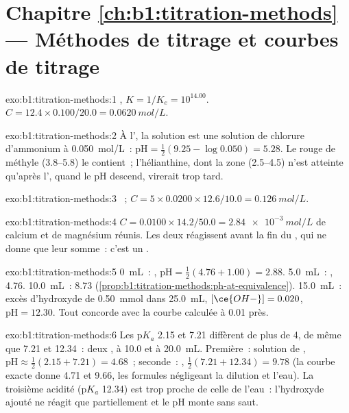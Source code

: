 \section*{Chapitre \ref{ch:b1:titration-methods} --- Méthodes de titrage et courbes de titrage}

\begin{solution}{exo:b1:titration-methods:1}
, $K = 1/K_e = 10^{14.00}$. $C = 12.4 \times
0.100/20.0 = \qty{0.0620}{mol/L}$.
\end{solution}

\begin{solution}{exo:b1:titration-methods:2}
À l', la solution est une solution de chlorure d'ammonium à
\qty{0.050}{mol/L}~: $\mathrm{pH} = \frac12(9.25 - \log 0.050) = 5.28$.
Le rouge de méthyle (3.8--5.8) le contient~; l'hélianthine, dont la zone
(2.5--4.5) n'est atteinte qu'après l', quand le pH descend,
virerait trop tard.
\end{solution}

\begin{solution}{exo:b1:titration-methods:3}
~;
$C = 5 \times 0.0200 \times 12.6/10.0 = \qty{0.126}{mol/L}$.
\end{solution}

\begin{solution}{exo:b1:titration-methods:4}
$C = 0.0100 \times 14.2/50.0 = \qty{2.84e-3}{mol/L}$ de calcium et de
magnésium réunis. Les deux réagissent avant la fin du , qui ne
donne que leur somme~: c'est un .
\end{solution}

\begin{solution}{exo:b1:titration-methods:5}
0~mL~: , $\mathrm{pH} = \frac12(4.76 + 1.00) = 2.88$.
5.0~mL~: , 4.76. 10.0~mL~: 8.73
(\cref{prop:b1:titration-methods:ph-at-equivalence}). 15.0~mL~: excès
d'hydroxyde de \qty{0.50}{mmol} dans \qty{25.0}{mL},
$[\ce{OH-}] = 0.020$, $\mathrm{pH} = 12.30$. Tout concorde avec la courbe
calculée à 0.01 près.
\end{solution}

\begin{solution}{exo:b1:titration-methods:6}
Les $\mathrm{p}K_a$ 2.15 et 7.21 diffèrent de plus de 4, de même que
7.21 et 12.34~: deux , à 10.0 et à \qty{20.0}{mL}.
Première~: solution de ,
$\mathrm{pH} \approx \frac12(2.15 + 7.21) = 4.68$~; seconde~:
, $\frac12(7.21 + 12.34) = 9.78$ (la courbe exacte donne 4.71
et 9.66, les formules négligeant la dilution et l'eau). La troisième
acidité ($\mathrm{p}K_a$ 12.34) est trop proche de celle de l'eau~:
l'hydroxyde ajouté ne réagit que partiellement et le pH monte sans saut.
\end{solution}

